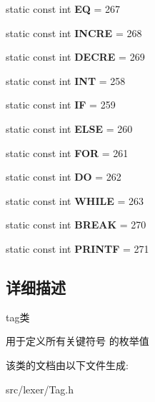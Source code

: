 \begin{DoxyCompactItemize}
\item 
static const int {\bfseries EQ} = 267\hypertarget{class_tag_a654bec3c95903280d16610fadf8eeec5}{}\label{class_tag_a654bec3c95903280d16610fadf8eeec5}

\item 
static const int {\bfseries I\+N\+C\+RE} = 268\hypertarget{class_tag_aed087674890e23fb6678d597824c2613}{}\label{class_tag_aed087674890e23fb6678d597824c2613}

\item 
static const int {\bfseries D\+E\+C\+RE} = 269\hypertarget{class_tag_ab37502d40b1d318449f44302ff5db17d}{}\label{class_tag_ab37502d40b1d318449f44302ff5db17d}

\item 
static const int {\bfseries I\+NT} = 258\hypertarget{class_tag_a38242d609491f491ef9484f1679e7c3d}{}\label{class_tag_a38242d609491f491ef9484f1679e7c3d}

\item 
static const int {\bfseries IF} = 259\hypertarget{class_tag_a92a30db62631be16cad518d2bf59efaa}{}\label{class_tag_a92a30db62631be16cad518d2bf59efaa}

\item 
static const int {\bfseries E\+L\+SE} = 260\hypertarget{class_tag_a4149b756bf94ef2d83f0d1de23ddee10}{}\label{class_tag_a4149b756bf94ef2d83f0d1de23ddee10}

\item 
static const int {\bfseries F\+OR} = 261\hypertarget{class_tag_ac2ba80666f85af3bd539107c7121b16d}{}\label{class_tag_ac2ba80666f85af3bd539107c7121b16d}

\item 
static const int {\bfseries DO} = 262\hypertarget{class_tag_a489769ae22c0fcf7c7842206a998abf8}{}\label{class_tag_a489769ae22c0fcf7c7842206a998abf8}

\item 
static const int {\bfseries W\+H\+I\+LE} = 263\hypertarget{class_tag_a1ca35b43b49867c19d892103016b09b3}{}\label{class_tag_a1ca35b43b49867c19d892103016b09b3}

\item 
static const int {\bfseries B\+R\+E\+AK} = 270\hypertarget{class_tag_a125fe413cdcec181606fa122a40f0026}{}\label{class_tag_a125fe413cdcec181606fa122a40f0026}

\item 
static const int {\bfseries P\+R\+I\+N\+TF} = 271\hypertarget{class_tag_a85ff0086e29d3d6a8f6c78695df0bd52}{}\label{class_tag_a85ff0086e29d3d6a8f6c78695df0bd52}

\end{DoxyCompactItemize}


\subsection{详细描述}
tag类 

用于定义所有关键符号 的枚举值 

该类的文档由以下文件生成\+:\begin{DoxyCompactItemize}
\item 
src/lexer/Tag.\+h\end{DoxyCompactItemize}
